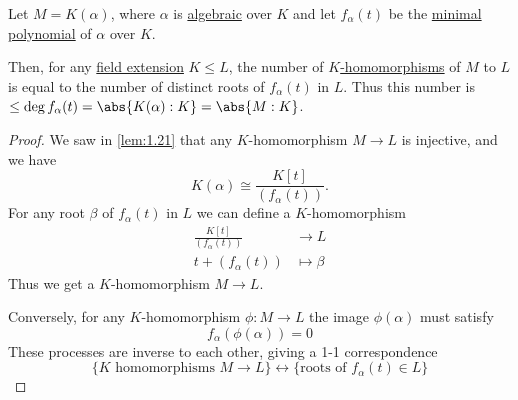 \documentclass{article}
\begin{document}
\begin{nlemma}\label{lem:2.6}
    Let $M = K(\alpha)$, where $\alpha$ is \hyperlink{def:algebraic}{algebraic} over $K$ and let $f_\alpha(t)$ be the \hyperlink{def:minimalPoly}{minimal polynomial} of $\alpha$ over $K$.

    Then, for any \hyperlink{def:fieldExt}{field extension} $K \leq L$, the number of \hyperlink{def:homo}{$K$-homomorphisms} of $M$ to $L$ is equal to the number of distinct roots of $f_\alpha(t)$ in $L$.
    Thus this number is $\leq \deg f_\alpha(t) = \abs{K(\alpha):K} = \abs{M:K}$.

    \begin{center}
    \end{center}
\end{nlemma}

\begin{proof}
    We saw in \cref{lem:1.21} that any $K$-homomorphism $M \to L$ is injective, and we have
    \begin{equation*}
        K(\alpha) \cong \frac{K[t]}{(f_\alpha(t))}.
    \end{equation*}
    For any root $\beta$ of $f_\alpha(t)$ in $L$ we can define a $K$-homomorphism
    \begin{align*}
        \frac{K[t]}{(f_\alpha(t))} &\to L \\
        t + (f_\alpha(t)) &\mapsto \beta
    \end{align*}
    Thus we get a $K$-homomorphism $M \to L$.

    Conversely, for any $K$-homomorphism $\phi:M \to L$ the image $\phi(\alpha)$ must satisfy
    \begin{equation*}f_\alpha(\phi(\alpha)) = 0\end{equation*}
    These processes are inverse to each other, giving a 1-1 correspondence
    \begin{equation*}
        \{K \text{ homomorphisms } M \to L\} \longleftrightarrow \{\text{roots of } f_\alpha(t) \in L\}
    \end{equation*}
\end{proof}
\end{document}
